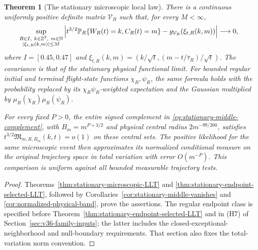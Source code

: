 \documentclass[11pt,reqno]{amsart}
\numberwithin{equation}{section}
\newtheorem{leadtheorem}{Theorem}
\theoremstyle{definition}\newtheorem{definition}[theorem]{Definition}
\theoremstyle{remark}\newtheorem{remark}[theorem]{Remark}
\begin{document}
\begin{leadtheorem}[The stationary microscopic local law]
\label{thm:intro-stationary-microscopic}
There is a continuous uniformly positive definite matrix $\mathcal V_R$
such that, for every $M<\infty$,
\begin{equation}\label{eq:intro-stationary-local-law}
 \sup_{\substack{R\in I,\ k\in\mathbb Z^2,\ m\in\mathbb N\\
                     |\xi_{t,R}(k,m)|\le M}}
 \left|t^{3/2}\mathbb P_R\{W_R(t)=k,C_R(t)=m\}
              -g_{\mathcal V_R}(\xi_{t,R}(k,m))\right|\longrightarrow0,
\end{equation}
where $I=[0.45,0.47]$ and
$\xi_{t,R}(k,m)=(k/\sqrt t,(m-t/\bar\tau_R)/\sqrt t)$.
The covariance is that of the stationary physical functional limit.
For bounded regular initial and terminal flight-state functions
$\chi_R,\psi_R$, the same formula holds with the probability replaced
by its $\chi_R\psi_R$-weighted expectation and the Gaussian multiplied
by $\mu_R(\chi_R)\mu_R(\psi_R)$.

For every fixed $P>0$, the entire signed complement in
\eqref{eq:stationary-middle-complement}, with $B_m=m^{P+3/2}$ and
physical central radius $2m^{-99/200}$, satisfies
$t^{3/2}\mathfrak M_{m,R,B_m}(k,t)=o(1)$ on these central sets.
The positive likelihood for the same microscopic event then approximates
its normalized conditional measure on the original trajectory space
in total variation with error $O(m^{-P})$. This comparison is uniform
against all bounded measurable trajectory tests.
\end{leadtheorem}
\begin{proof}
Theorems~\ref{thm:stationary-microscopic-LLT} and
\ref{thm:stationary-endpoint-selected-LLT}, followed by
Corollaries~\ref{cor:stationary-middle-vanishes} and
\ref{cor:normalized-physical-band}, prove the assertions. The regular
endpoint class is specified before
Theorem~\ref{thm:stationary-endpoint-selected-LLT} and in
\textup{(H7)} of Section~\ref{sec:v36-family-inputs}; the latter includes
the closed-exceptional-neighborhood and null-boundary requirements.
That section also fixes the total-variation norm convention.
\end{proof}
\end{document}
